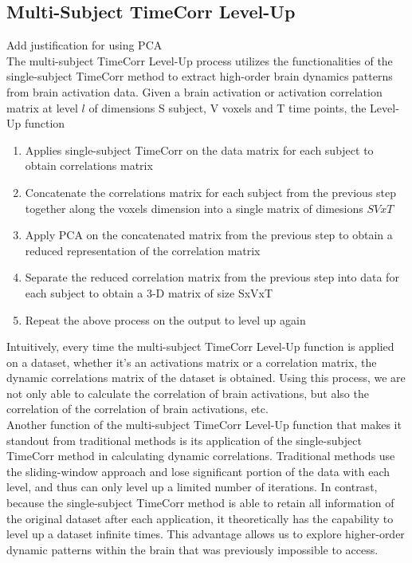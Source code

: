\documentclass[12pt]{article}
\begin{document}
\subsection{Multi-Subject TimeCorr Level-Up}
Add justification for using PCA\\

The multi-subject TimeCorr Level-Up process utilizes the functionalities of the single-subject TimeCorr method to extract high-order brain dynamics patterns from brain activation data. Given a brain activation or activation correlation matrix at level $l$ of dimensions S subject, V voxels and T time points, the Level-Up function\\
\begin{enumerate}
\item Applies single-subject TimeCorr on the data matrix for each subject to obtain correlations matrix\\
\item Concatenate the correlations matrix for each subject from the previous step together along the voxels dimension into a single matrix of dimesions $SVxT$\\
\item Apply PCA on the concatenated matrix from the previous step to obtain a reduced representation of the correlation matrix\\
\item Separate the reduced correlation matrix from the previous step into data for each subject to obtain a 3-D matrix of size SxVxT
\item Repeat the above process on the output to level up again
\end{enumerate}
Intuitively, every time the multi-subject TimeCorr Level-Up function is applied on a dataset, whether it's an activations matrix or a correlation matrix, the dynamic correlations matrix of the dataset is obtained. Using this process, we are not only able to calculate the correlation of brain activations, but also the correlation of the correlation of brain activations, etc. \\
Another function of the multi-subject TimeCorr Level-Up function that makes it standout from traditional methods is its application of the single-subject TimeCorr method in calculating dynamic correlations. Traditional methods use the sliding-window approach and lose significant portion of the data with each level, and thus can only level up a limited number of iterations. In contrast, because the single-subject TimeCorr method is able to retain all information of the original dataset after each application, it theoretically has the capability to level up a dataset infinite times. This advantage allows us to explore higher-order dynamic patterns within the brain that was previously impossible to access.\\
\end{document}
